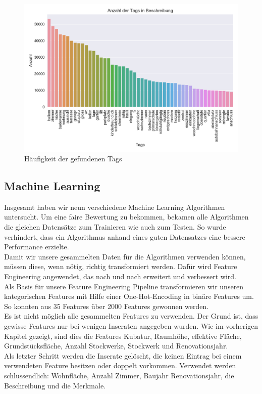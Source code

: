 \begin{figure}[ht]
\centering
\includegraphics[width=\textwidth]{images/tags.png}
\caption[Häufigkeit der gefundenen Tags]{Häufigkeit der gefundenen Tags}%
\label{fig:tags}
\end{figure}
\newline
%
\subsection{Machine Learning}
Insgesamt haben wir neun verschiedene Machine Learning Algorithmen untersucht. Um eine faire Bewertung zu bekommen, bekamen alle Algorithmen die gleichen Datensätze zum Trainieren wie auch zum Testen. So wurde verhindert, dass ein Algorithmus anhand eines guten Datensatzes eine bessere Performance erzielte.\\[2ex]
%
Damit wir unsere gesammelten Daten für die Algorithmen verwenden können, müssen diese, wenn nötig, richtig transformiert werden. Dafür wird Feature Engineering angewendet, das nach und nach erweitert und verbessert wird.\\[2ex]
%
Als Basis für unsere Feature Engineering Pipeline transformieren wir unseren kategorischen Features mit Hilfe einer One-Hot-Encoding in binäre Features um. So konnten aus 35 Features über 2000 Features gewonnen werden.\\
Es ist nicht möglich alle gesammelten Features zu verwenden. Der Grund ist, dass gewisse Features nur bei wenigen Inseraten angegeben wurden. Wie im vorherigen Kapitel gezeigt, sind dies die Features Kubatur, Raumhöhe, effektive Fläche, Grundstücksfläche, Anzahl Stockwerke, Stockwerk und Renovationsjahr.\\
Als letzter Schritt werden die Inserate gelöscht, die keinen Eintrag bei einem verwendeten Feature besitzen oder doppelt vorkommen. Verwendet werden schlussendlich: Wohnfläche, Anzahl Zimmer, Baujahr Renovationsjahr, die Beschreibung und die Merkmale.
%

